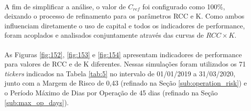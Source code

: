 

\paragraph{} A fim de simplificar a análise, o valor de \begin{math} C_{ref} \end{math} foi configurado como 100\%, deixando o processo de refinamento para os parâmetros RCC e K. Como ambos influenciam diretamente o uso de capital e todos os indicadores de performance, foram acoplados e analisados conjuntamente através das curvas de \begin{math} RCC \times K \end{math}.

\paragraph{} As Figuras \ref{fig:152}, \ref{fig:153} e \ref{fig:154} apresentam indicadores de performance para valores de RCC e de K diferentes. Nessas simulações foram utilizados os 71 \textit{tickers} indicados na Tabela \ref{tab:5} no intervalo de 01/01/2019 a 31/03/2020, junto com a Margem de Risco de 0,43 (refinado na Seção \ref{sub:operation_risk}) e o Período Máximo de Dias por Operação de 45 dias (refinado na Seção \ref{sub:max_op_days}).

